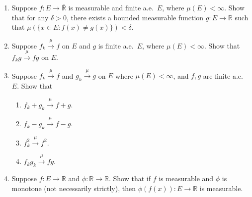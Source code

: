 \documentclass{article}
\newcommand{\mto}{\stackrel{\mu}{\rightarrow}}
\begin{document}
\begin{enumerate}

\item Suppose $f:E \to \bar{\mathbb{R}}$ is measurable and finite a.e.~$E$, where $\mu(E) < \infty$. Show that for any $\delta > 0$, there exists a bounded measurable function $g: E \to \mathbb{R}$ such that $\mu( \{x \in E: f(x) \ne g(x)\} ) < \delta$.




\item Suppose $f_{k} \mto f$ on $E$ and $g$ is finite a.e.~$E$, where $\mu(E) < \infty$. Show that $f_{k}g \mto fg$ on $E$.





\item Suppose $f_{k} \mto f$ and $g_{k} \mto g$ on $E$ where $\mu( E)< \infty$, and $f,g$ are finite a.e.~$E$. Show that
\begin{enumerate}
\item $f_{k} + g_{k} \mto f + g$.
\item $f_{k} - g_{k} \mto f - g$.
\item $f_{k}^{2} \mto f^{2}$.
\item $f_{k}g_{k} \mto fg$.
\end{enumerate}






\item Suppose $f: E \to \mathbb{R}$ and $\phi: \mathbb{R} \to \mathbb{R}$. Show that if $f$ is measurable and $\phi$ is monotone (not necessarily strictly), then $\phi(f(x)): E \to \mathbb{R}$ is measurable.




\end{enumerate}
\end{document}
